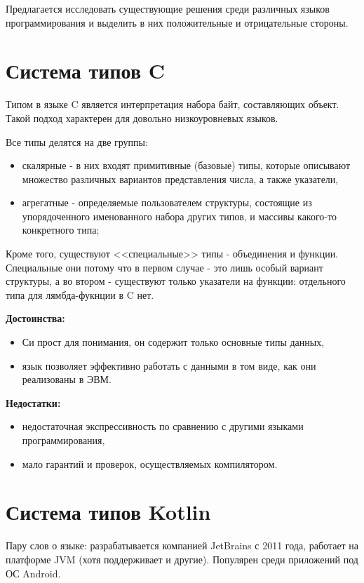 Предлагается исследовать существующие решения среди различных языков программирования и выделить в них положительные и отрицательные стороны.

\section{Система типов C}
\label{sec:c_type_system}

Типом в языке C является интерпретация набора байт, составляющих объект.
Такой подход характерен для довольно низкоуровневых языков.

Все типы делятся на две группы:
\begin{itemize}
    \item скалярные - в них входят примитивные (базовые) типы, которые описывают множество различных вариантов представления числа, а также указатели,
    \item агрегатные - определяемые пользователем структуры, состоящие из упорядоченного именованного набора других типов, и массивы какого-то конкретного типа;
\end{itemize}

Кроме того, существуют <<специальные>> типы - объединения и функции.
Специальные они потому что в первом случае - это лишь особый вариант структуры, а во втором - существуют только указатели на функции: отдельного типа для лямбда-фукнции в C нет.

\textbf{Достоинства:}
\begin{itemize}
    \item Си прост для понимания, он содержит только основные типы данных,
    \item язык позволяет эффективно работать с данными в том виде, как они реализованы в ЭВМ.
\end{itemize}

\textbf{Недостатки:}
\begin{itemize}
    \item недостаточная экспрессивность по сравнению с другими языками программирования,
    \item мало гарантий и проверок, осуществляемых компилятором.
\end{itemize}

\section{Система типов Kotlin}
\label{sec:kotlin_type_system}

Пару слов о языке: разрабатывается компанией JetBrains с 2011 года, работает на платформе JVM (хотя поддерживает и другие).
Популярен среди приложений под ОС Android\cite{KotlinTypeSpec}.

